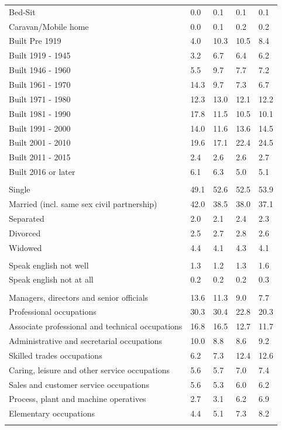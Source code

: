 \documentclass{article}
\begin{document}
\begin{table}[h]
\begin{tabular}{KTTTT}
Bed-Sit & 0.0& 0.1& 0.1& 0.1\\
Caravan/Mobile home & 0.0& 0.1& 0.2& 0.2\\
    \hline
Built Pre 1919 &  4.0& 10.3& 10.5&  8.4\\
Built 1919 - 1945 & 3.2& 6.7& 6.4& 6.2\\
Built  1946 - 1960 & 5.5& 9.7& 7.7& 7.2\\
Built  1961 - 1970 & 14.3&  9.7&  7.3&  6.7\\
Built  1971 - 1980 & 12.3& 13.0& 12.1& 12.2\\
Built  1981 - 1990 & 17.8& 11.5& 10.5& 10.1\\
Built  1991 - 2000 & 14.0& 11.6& 13.6& 14.5\\
Built  2001 - 2010 & 19.6& 17.1& 22.4& 24.5\\
Built  2011 - 2015 & 2.4& 2.6& 2.6& 2.7\\
Built  2016 or later & 6.1& 6.3& 5.0& 5.1\\
\hline
    \\
    \hline
Single & 49.1& 52.6& 52.5& 53.9\\
Married (incl. same sex civil partnership) & 42.0& 38.5& 38.0& 37.1\\
Separated  & 2.0& 2.1& 2.4& 2.3\\
Divorced  & 2.5& 2.7& 2.8& 2.6\\
Widowed & 4.4& 4.1& 4.3& 4.1\\
\hline
    \\ 
    \hline
Speak english not well & 1.3& 1.2& 1.3& 1.6\\
Speak english not at all & 0.2& 0.2& 0.2& 0.3\\
\hline
    \\
    \hline
Managers, directors and senior officials & 13.6& 11.3&  9.0&  7.7\\
Professional occupations & 30.3& 30.4& 22.8& 20.3\\
Associate professional and technical occupations & 16.8& 16.5& 12.7& 11.7\\
Administrative and secretarial occupations & 10.0&  8.8&  8.6&  9.2\\
Skilled trades occupations &  6.2&  7.3& 12.4& 12.6\\
Caring, leisure and other service occupations & 5.6& 5.7& 7.0& 7.4\\
Sales and customer service occupations & 5.6& 5.3& 6.0& 6.2\\
Process, plant and machine operatives & 2.7& 3.1& 6.2& 6.9\\
Elementary occupations & 4.4& 5.1& 7.3& 8.2\\
\hline
\end{tabular}
\end{table}
\end{document}

